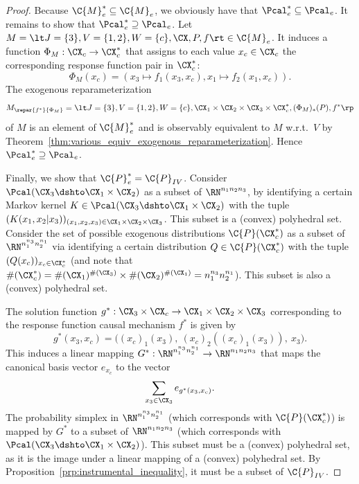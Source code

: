 \begin{proof}
  Because $\C{M}_e^* \subseteq \C{M}_e$, we obviously have that $\Pcal_e^* \subseteq \Pcal_e$. It remains to show that $\Pcal_e^* \supseteq \Pcal_e$.
  Let $M = \lt J=\{3\}, V=\{1,2\}, W=\{c\}, \CX, P, f \rt \in \C{M}_e$.
  It induces a function $\Phi_M : \CX_c \to \CX_c^*$ that assigns to each value $x_c \in \CX_c$ the corresponding response function pair in $\CX_c^*$:
  $$\Phi_M(x_c) = (x_3 \mapsto f_1(x_3, x_c), x_1 \mapsto f_2(x_1, x_c)).$$
  The exogenous reparameterization
  $$M_{\repar{f^*}{\Phi_M}} = \lt J=\{3\}, V=\{1,2\}, W=\{c\}, \CX_1 \times \CX_2 \times \CX_3 \times \CX_{c}^*, (\Phi_M)_*(P), f^* \rp$$
  of $M$ is an element of $\C{M}_e^*$ and is observably equivalent to $M$ w.r.t.\ $V$ by Theorem~\ref{thm:various_equiv_exogenous_reparameterization}.
  Hence $\Pcal_e^* \supseteq \Pcal_e$.

  Finally, we show that $\C{P}_e^* = \C{P}_{IV}$.
  Consider $\Pcal(\CX_3 \dshto \CX_1 \times \CX_2)$ as a subset of $\RN^{n_1 n_2 n_3}$, by identifying a certain Markov kernel $K \in \Pcal(\CX_3 \dshto \CX_1 \times \CX_2)$ with the tuple $(K(x_1,x_2|x_3))_{(x_1,x_2,x_3) \in \CX_1 \times \CX_2 \times \CX_3}$.
  This subset is a (convex) polyhedral set.
  Consider the set of possible exogenous distributions $\C{P}(\CX_c^*)$ as a subset of $\RN^{n_1^{n_3} n_2^{n_1}}$
  via identifying a certain distribution $Q \in \C{P}(\CX_c^*)$ with the tuple
  $(Q(x_c))_{x_c \in \CX_c^*}$
  (and note that $\#(\CX_c^*) = \#(\CX_1)^{\#(\CX_3)} \times \#(\CX_2)^{\#(\CX_1)} = n_1^{n_3} n_2^{n_1}$).
  This subset is also a (convex) polyhedral set.

  The solution function $g^* : \CX_3 \times \CX_c \to \CX_1 \times \CX_2 \times \CX_3$ corresponding to the response function causal mechanism $f^*$ is given by
  $$g^*(x_3,x_c) = \big((x_c)_1(x_3),\ (x_c)_2((x_c)_1(x_3)),\ x_3\big).$$
  This induces a linear mapping $G^* : \RN^{n_1^{n_3} n_2^{n_1}} \to \RN^{n_1 n_2 n_3}$ that maps the canonical basis vector $e_{x_c}$ to the vector
  $$\sum_{x_3 \in \CX_3} e_{g^*(x_3,x_c)}.$$
  The probability simplex in $\RN^{n_1^{n_3} n_2^{n_1}}$ (which corresponds with $\C{P}(\CX_c^*)$) is mapped by $G^*$ to a subset of $\RN^{n_1 n_2 n_3}$ (which corresponds with $\Pcal(\CX_3 \dshto \CX_1 \times \CX_2)$).
  This subset must be a (convex) polyhedral set, as it is the image under a linear mapping of a (convex) polyhedral set.
  By Proposition~\ref{prp:instrumental_inequality}, it must be a subset of $\C{P}_{IV}$.


\end{proof}
